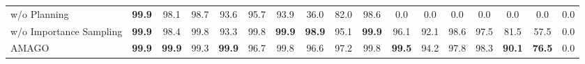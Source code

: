 \begin{table}[ht]
{\begin{tabular}{@{}lcccccccccccccccc@{}}
w/o Planning         & \textbf{99.9}                                           & 98.1                                                     & 98.7                                                   & 93.6                                               & 95.7                                                   & 93.9                                                  & 36.0                                               & 82.0                                                     & 98.6                                                    & 0.0                                                      & 0.0                                                      & 0.0                                                      & 0.0                                                    & 0.0                                                     & 0.0                                                        & 0.0                                                              \\
w/o Importance Sampling       & \textbf{99.9}                                           & 98.4                                                     & 99.8                                                   & 93.3                                               & 99.8                                                   & \textbf{99.9}                                         & \textbf{98.9}                                      & 95.1                                                     & \textbf{99.9}                                           & 96.1                                                     & 92.1                                                     & 98.6                                                     & 97.5                                                   & 81.5                                                    & 57.5                                                       & 0.0                                                              \\ \midrule
AMAGO                & \textbf{99.9}                                           & \textbf{99.9}                                            & 99.3                                                   & \textbf{99.9}                                      & 96.7                                                   & 99.8                                                  & 96.6                                               & 97.2                                                     & 99.8                                                    & \textbf{99.5}                                            & 94.2                                                     & 97.8                                                     & 98.3                                                   & \textbf{90.1}                                                    & \textbf{76.5}                                              & 0.0                                                              \\

\end{tabular}}
\end{table}
